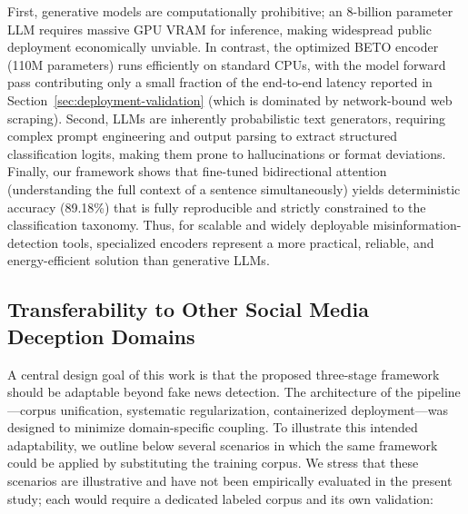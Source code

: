 \documentclass[informatics,article,accept,pdftex,moreauthors]{Definitions/mdpi}
\begin{document}
First, generative models are computationally prohibitive; an 8-billion parameter LLM requires massive GPU VRAM for inference, making widespread public deployment economically unviable. In contrast, the optimized BETO encoder (110M parameters) runs efficiently on standard CPUs, with the model forward pass contributing only a small fraction of the end-to-end latency reported in Section~\ref{sec:deployment-validation} (which is dominated by network-bound web scraping). Second, LLMs are inherently probabilistic text generators, requiring complex prompt engineering and output parsing to extract structured classification logits, making them prone to hallucinations or format deviations. Finally, our framework shows that fine-tuned bidirectional attention (understanding the full context of a sentence simultaneously) yields deterministic accuracy (89.18\%) that is fully reproducible and strictly constrained to the classification taxonomy. Thus, for scalable and widely deployable misinformation-detection tools, specialized encoders represent a more practical, reliable, and energy-efficient solution than generative LLMs.

\subsection{Transferability to Other Social Media Deception Domains}
A central design goal of this work is that the proposed three-stage framework should be adaptable beyond fake news detection. The architecture of the pipeline—corpus unification, systematic regularization, containerized deployment—was designed to minimize domain-specific coupling. To illustrate this intended adaptability, we outline below several scenarios in which the same framework could be applied by substituting the training corpus. We stress that these scenarios are illustrative and have not been empirically evaluated in the present study; each would require a dedicated labeled corpus and its own validation:
\end{document}
